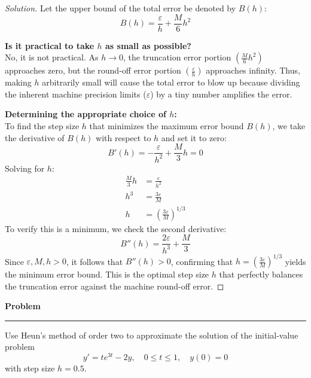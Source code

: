 \documentclass[11pt, a4paper]{article}
\newcommand{\eps}{\varepsilon}
\newenvironment{problem}{%
  \begin{tcolorbox}[
    colback=blue!4!white,
    colframe=blue!38!black,
    boxrule=0.95pt,
    arc=3pt,
    left=11pt,
    right=11pt,
    top=10pt,
    bottom=11pt,
    before skip=12pt,
    after skip=14pt,
  ]
  \noindent\textbf{\textcolor{blue!35!black}{Problem}}\par\nointerlineskip
  {\color{blue!42!black}\rule{\linewidth}{0.55pt}}\par\vspace{0.55em}%
}{%
  \end{tcolorbox}%
}
\newif\ifsolutionnewpage
\newenvironment{solution}
  {\begin{proof}[Solution]}
  {\end{proof}\ifsolutionnewpage\newpage\fi}
\begin{document}
\begin{solution}
        Let the upper bound of the total error be denoted by $B(h)$:
        \begin{equation*}
        B(h) = \frac{\eps}{h} + \frac{M}{6}h^2
        \end{equation*}
        
        \textbf{Is it practical to take $h$ as small as possible?} \\
        No, it is not practical. As $h \to 0$, the truncation error portion $\left(\frac{M}{6}h^2\right)$ approaches zero, but the round-off error portion $\left(\frac{\eps}{h}\right)$ approaches infinity. Thus, making $h$ arbitrarily small will cause the total error to blow up because dividing the inherent machine precision limits ($\eps$) by a tiny number amplifies the error.
        
        \textbf{Determining the appropriate choice of $h$:} \\
        To find the step size $h$ that minimizes the maximum error bound $B(h)$, we take the derivative of $B(h)$ with respect to $h$ and set it to zero:
        \begin{equation*}
        B'(h) = -\frac{\eps}{h^2} + \frac{M}{3}h = 0
        \end{equation*}
        Solving for $h$:
        \begin{align*}
        \frac{M}{3}h &= \frac{\eps}{h^2} \\
        h^3 &= \frac{3\eps}{M} \\
        h &= \left( \frac{3\eps}{M} \right)^{1/3}
        \end{align*}
        To verify this is a minimum, we check the second derivative:
        \begin{equation*}
        B''(h) = \frac{2\eps}{h^3} + \frac{M}{3}
        \end{equation*}
        Since $\eps, M, h > 0$, it follows that $B''(h) > 0$, confirming that $h = \left( \frac{3\eps}{M} \right)^{1/3}$ yields the minimum error bound. This is the optimal step size $h$ that perfectly balances the truncation error against the machine round-off error.
        \end{solution}

        
\begin{problem}
    Use Heun's method of order two to approximate the solution of the initial-value problem
    \begin{equation*}
    y' = te^{3t} - 2y, \quad 0 \le t \le 1, \quad y(0) = 0
    \end{equation*}
    with step size $h = 0.5$.
    \end{problem}
    
\end{document}
